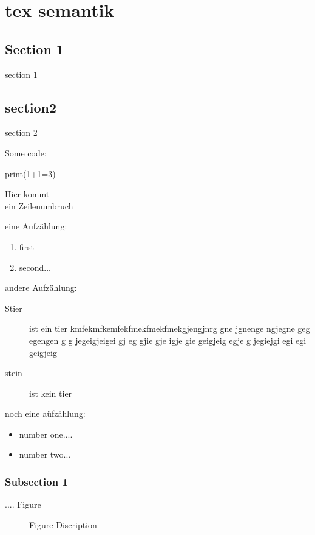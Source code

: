\documentclass[german,version-2020-11]{uzl-thesis}
\begin{document}
\chapter{tex semantik}

\section{Section 1}
section 1


\section{section2}
section 2


Some code:
\begin{Code}
print(1+1=3)
\end{Code}

Hier kommt \\ ein Zeilenumbruch

   eine Aufzählung:

   \begin{enumerate}
   \item 
     first
   \item
     second...
   \end{enumerate}
   
   andere Aufzählung:
   
   \begin{description}
   \item[Stier] 
     ist ein tier kmfekmfkemfekfmekfmekfmekgjengjnrg gne jgnenge ngjegne geg egengen g g jegeigjeigei gj eg gjie gje igje gie geigjeig  egje g jegiejgi egi egi geigjeig
   \item[stein]
     ist kein tier
   \end{description}
   
   noch eine aüfzählung:
   
   \begin{itemize}
     \item number one....
     \item
       number two...
     \end{itemize}
   
   
   \subsection{Subsection 1}
   ....
   Figure
   
   \begin{figure}[htbp]
     \centering
     \textcolor{black!10}{\vrule width3cm height 3cm}
     \caption{Figure Discription}
     \label{fig-ode1}
   
   \end{figure}
   
\end{document}
